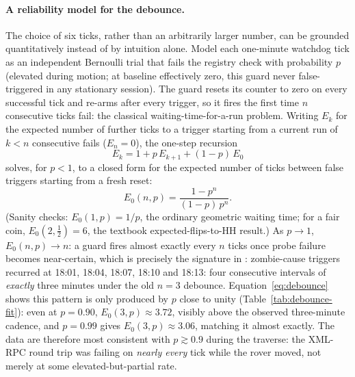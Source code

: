 \paragraph{A reliability model for the debounce.} The choice of six ticks,
rather than an arbitrarily larger number, can be grounded quantitatively
instead of by intuition alone. Model each one-minute watchdog tick as an
independent Bernoulli trial that fails the  registry
check with probability $p$ (elevated during motion; at baseline effectively
zero, this guard never false-triggered in any stationary session). The
guard resets its counter to zero on every successful tick and re-arms after
every trigger, so it fires the first time $n$ consecutive ticks fail: the
classical waiting-time-for-a-run problem. Writing $E_k$ for the expected
number of further ticks to a trigger starting from a current run of
$k<n$ consecutive fails ($E_n=0$), the one-step recursion
\begin{equation}
E_k = 1 + p\,E_{k+1} + (1-p)\,E_0
\end{equation}
solves, for $p<1$, to a closed form for the expected number of ticks between
false triggers starting from a fresh reset:
\begin{equation}
\label{eq:debounce}
E_0(n,p) = \frac{1-p^n}{(1-p)\,p^n}.
\end{equation}
(Sanity checks: $E_0(1,p)=1/p$, the ordinary geometric waiting time; for a
fair coin, $E_0(2,\tfrac12)=6$, the textbook expected-flips-to-HH result.)
As $p\to1$, $E_0(n,p)\to n$: a guard fires almost exactly every $n$ ticks
once probe failure becomes near-certain, which is precisely the signature in
: zombie-cause triggers recurred at 18:01, 18:04, 18:07,
18:10 and 18:13: four consecutive intervals of \emph{exactly} three
minutes under the old $n=3$ debounce. Equation~\eqref{eq:debounce} shows
this pattern is only produced by $p$ close to unity
(Table~\ref{tab:debounce-fit}): even at $p=0.90$, $E_0(3,p)\approx3.72$,
visibly above the observed three-minute cadence, and $p=0.99$ gives
$E_0(3,p)\approx3.06$, matching it almost exactly. The data are therefore
most consistent with $p\gtrsim0.9$ during the traverse: the XML-RPC round
trip was failing on \emph{nearly every} tick while the rover moved, not
merely at some elevated-but-partial rate.

